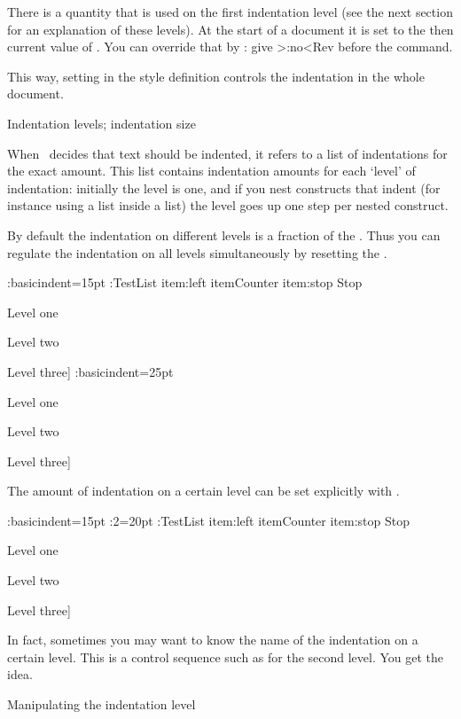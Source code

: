 There is a quantity  that is used on the first
indentation level (see the next section for an explanation of these
levels). At the start of a document it is set to the then current
value of . You can override that by
: give
\Ver>\BasicIndentIsSet:no<Rev before the  command.

This way, setting  in the style definition controls the
indentation in the whole document.

\SubSection Indentation levels; indentation size

When \Lollipop\ decides that text should be indented, it refers to a
list of indentations for the exact amount. This list contains
indentation amounts for each `level' of indentation: initially the
level is one, and if you nest constructs that indent (for instance
using a list inside a list) the level goes up one step per nested
construct.

By
default the indentation on different levels is a fraction of the
. Thus you can regulate the indentation on
all levels simultaneously by resetting the .

\Example
\Distance:basicindent=15pt
\DefineList:TestList item:left itemCounter item:stop Stop
\TestList\item Level one \TestList\item Level two
\TestList\item Level three\>]
\Distance:basicindent=25pt
\TestList\item Level one \TestList\item Level two
\TestList\item Level three\>]
\ExampleStop

The amount of
indentation on a certain level can be set explicitly with
.

\Example
\Distance:basicindent=15pt
\LevelIndent:2=20pt
\DefineList:TestList item:left itemCounter item:stop Stop
\TestList\item Level one \TestList\item Level two
\TestList\item Level three\>]
\ExampleStop

In fact, sometimes you may want to know the name of the indentation
on a certain level. This is a control sequence such as
 for the second level. You get the idea.

\SubSection Manipulating the indentation level

